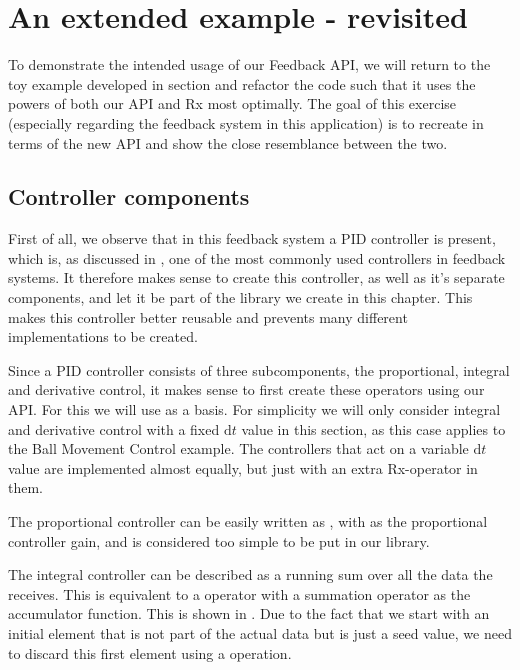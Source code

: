 \section{An extended example - revisited}
\label{sec:reactive-balltracker}
To demonstrate the intended usage of our Feedback API, we will return to the toy example developed in section  and refactor the code such that it uses the powers of both our API and Rx most optimally. The goal of this exercise (especially regarding the feedback system in this application) is to recreate  in terms of the new API and show the close resemblance between the two.

\subsection{Controller components}
First of all, we observe that in this feedback system a PID controller is present, which is, as discussed in , one of the most commonly used controllers in feedback systems. It therefore makes sense to create this controller, as well as it's separate components, and let it be part of the library we create in this chapter. This makes this controller better reusable and prevents many different implementations to be created.

Since a PID controller consists of three subcomponents, the proportional, integral and derivative control, it makes sense to first create these operators using our API. For this we will use  as a basis. For simplicity we will only consider integral and derivative control with a fixed $\mathrm{d} t$ value in this section, as this case applies to the Ball Movement Control example. The controllers that act on a variable $\mathrm{d} t$ value are implemented almost equally, but just with an extra  Rx-operator in them.

The proportional controller can be easily written as , with  as the proportional controller gain, and is considered too simple to be put in our library.

The integral controller can be described as a running sum over all the data the \comp receives. This is equivalent to a  operator with a summation operator as the accumulator function. This is shown in . Due to the fact that we start with an initial element that is not part of the actual data but is just a seed value, we need to discard this first element using a  operation.

